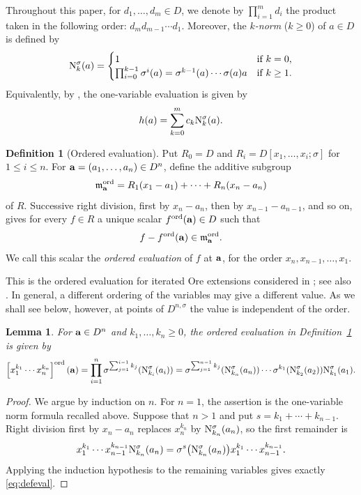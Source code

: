 \documentclass[11pt,reqno]{amsart}
\newtheorem{lem}[thm]{Lemma}
\theoremstyle{definition}
\newtheorem{defn}[thm]{Definition}
\begin{document}
Throughout this paper, for $d_1,\dots,d_m \in D$, we denote by $\prod_{i=1}^m d_i$ the product taken in the following order: $d_m d_{m-1} \cdots d_1$.
Moreover, the \emph{$k$-norm} ($k \geq 0$) of $a \in D$ is defined by
$$
{\rm N}^\sigma_k(a)=
\begin{cases}
1 & \textrm{if}\,\, k=0,\\
\prod_{i=0}^{k-1}\sigma^i(a)=\sigma^{k-1}(a)\cdots \sigma(a) a  & \textrm{if}\,\, k \geq 1.
\end{cases}
$$
Equivalently, by \cite[Lemma 2.4]{VL88}, the one-variable evaluation is given by
\[
h(a)=\sum_{k=0}^m c_k{\rm N}^\sigma_k(a).
\]

\begin{defn}[Ordered evaluation]\label{def:ordeval}
Put $R_0=D$ and $R_i=D[x_1,\ldots,x_i;\sigma]$ for $1\leq i\leq n$. For ${\bf a}=(a_1,\ldots,a_n)\in D^n$, define the additive subgroup
\[
\mathfrak{m}_{{\bf a}}^{\rm ord}=R_1(x_1-a_1)+\cdots+R_n(x_n-a_n)
\]
of $R$. Successive right division, first by $x_n-a_n$, then by $x_{n-1}-a_{n-1}$, and so on, gives for every $f\in R$ a unique scalar $f^{\rm ord}({\bf a})\in D$ such that
\[
f-f^{\rm ord}({\bf a})\in\mathfrak{m}_{{\bf a}}^{\rm ord}.
\]
We call this scalar the \emph{ordered evaluation} of $f$ at ${\bf a}$, for the order $x_n,x_{n-1},\ldots,x_1$.
\end{defn}
This is the ordered evaluation for iterated Ore extensions considered in \cite[Definition~2.3]{LN25}; see also \cite[Definition~7.2]{LM25}. In general, a different ordering of the variables may give a different value. As we shall see below, however, at points of $D^{n,\sigma}$ the value is independent of the order.

\begin{lem}\label{lem:ordevalformula}
For ${\bf a}\in D^n$ and $k_1,\ldots,k_n\geq 0$, the ordered evaluation in Definition~\ref{def:ordeval} is given by
\begin{equation}\label{eq:defeval}
\left[x_1^{k_1}\cdots x_{n}^{k_n}\right]^{\rm ord}({\bf a})=\prod_{i=1}^n \sigma^{\sum_{j=1}^{i-1}k_j}({\rm N}^\sigma_{k_i}(a_i))= \sigma^{\sum_{j=1}^{n-1}k_j}({\rm N}^\sigma_{k_n}(a_n))\cdots \sigma^{k_1}({\rm N}^\sigma_{k_2}(a_2)) {\rm N}^{\sigma}_{k_1}(a_1).
\end{equation}
\end{lem}
\begin{proof}
We argue by induction on $n$. For $n=1$, the assertion is the one-variable norm formula recalled above. Suppose that $n>1$ and put $s=k_1+\cdots+k_{n-1}$. Right division first by $x_n-a_n$ replaces $x_n^{k_n}$ by ${\rm N}^{\sigma}_{k_n}(a_n)$, so the first remainder is
\[
x_1^{k_1}\cdots x_{n-1}^{k_{n-1}}{\rm N}^{\sigma}_{k_n}(a_n)
=\sigma^s\big({\rm N}^{\sigma}_{k_n}(a_n)\big)x_1^{k_1}\cdots x_{n-1}^{k_{n-1}}.
\]
Applying the induction hypothesis to the remaining variables gives exactly \eqref{eq:defeval}.
\end{proof}
\end{document}
